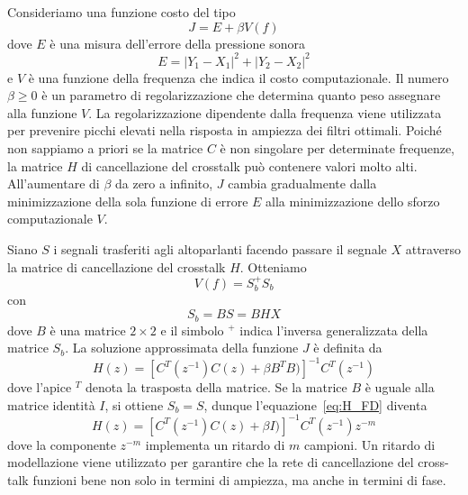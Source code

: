 \documentclass[12pt,a4paper,titlepage]{article}
\begin{document}
Consideriamo una funzione costo del tipo
\begin{equation}\label{eq:funzione_costo_fd}
J = E + \beta V(f)
\end{equation}
dove $E$ è una misura dell'errore della pressione sonora
\begin{equation}\label{eq:errore_fd}
E = | Y_1 - X_1 |^2  + | Y_2 - X_2 |^2
\end{equation}
e $V$ è una funzione della frequenza che indica il costo computazionale. Il numero $\beta \geq 0$ è un parametro di regolarizzazione che determina quanto peso
assegnare alla funzione $V$. La regolarizzazione dipendente dalla frequenza viene utilizzata per prevenire picchi elevati nella risposta in ampiezza dei filtri ottimali. Poiché non sappiamo a priori se la matrice $C$ è non singolare per determinate frequenze, la matrice $H$ di cancellazione del crosstalk può contenere valori molto alti. All'aumentare di $\beta$ da zero a infinito, $J$ cambia gradualmente dalla minimizzazione della sola funzione di errore $E$ alla minimizzazione dello sforzo computazionale $V$.

Siano $S$ i segnali trasferiti agli altoparlanti facendo passare il segnale $X$ attraverso la matrice di cancellazione del crosstalk $H$. Otteniamo
\begin{equation}
V(f) = S_b ^{+} S_b
\end{equation}
con
\begin{equation}
S_b = BS = BHX
\end{equation}
dove $B$ è una matrice $2 \times 2$ e il simbolo $^+$ indica l'inversa generalizzata della matrice $S_b$. La soluzione approssimata della funzione $J$ è definita da 
\begin{equation}\label{eq:H_FD}
H(z) = \left[C^T (z^{-1}) C(z) + \beta B^T B)\right]^{-1} C^T(z^{-1})
\end{equation}
dove l'apice $^T$ denota la trasposta della matrice. Se la matrice $B$ è uguale alla matrice identità $I$, si ottiene $S_b = S$, dunque l'equazione~\eqref{eq:H_FD} diventa
\begin{equation}\label{eq:H_FD2}
H(z) = \left[C^T (z^{-1}) C(z) + \beta I)\right]^{-1} C^T(z^{-1}) z^{-m}
\end{equation}
dove la componente $z^{-m}$ implementa un ritardo di $m$ campioni. Un ritardo di modellazione viene utilizzato per garantire che la rete di cancellazione del cross-talk funzioni bene non solo in termini di ampiezza, ma anche in termini di fase.
\end{document}
